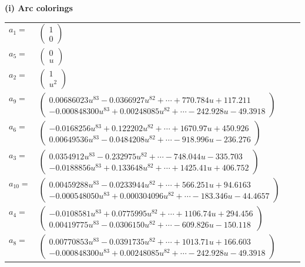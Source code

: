 \documentclass[1p]{elsarticle_modified}
\theoremstyle{definition}
\begin{document}
\flushleft \textbf{(i) Arc colorings}\\
\begin{tabular}{m{7pt} m{180pt} m{7pt} m{180pt} }
\flushright $a_{1}=$&$\begin{pmatrix}1\\0\end{pmatrix}$ \\
\flushright $a_{5}=$&$\begin{pmatrix}0\\u\end{pmatrix}$ \\
\flushright $a_{2}=$&$\begin{pmatrix}1\\u^2\end{pmatrix}$ \\
\flushright $a_{9}=$&$\begin{pmatrix}0.00686023 u^{83}-0.0366927 u^{82}+\cdots+770.784 u+117.211\\-0.000848300 u^{83}+0.00248085 u^{82}+\cdots-242.928 u-49.3918\end{pmatrix}$ \\
\flushright $a_{6}=$&$\begin{pmatrix}-0.0168256 u^{83}+0.122202 u^{82}+\cdots+1670.97 u+450.926\\0.00649536 u^{83}-0.0484208 u^{82}+\cdots-918.996 u-236.276\end{pmatrix}$ \\
\flushright $a_{3}=$&$\begin{pmatrix}0.0354912 u^{83}-0.232975 u^{82}+\cdots-748.044 u-335.703\\-0.0188856 u^{83}+0.133648 u^{82}+\cdots+1425.41 u+406.752\end{pmatrix}$ \\
\flushright $a_{10}=$&$\begin{pmatrix}0.00459288 u^{83}-0.0233944 u^{82}+\cdots+566.251 u+94.6163\\-0.000548050 u^{83}+0.000304096 u^{82}+\cdots-183.346 u-44.4657\end{pmatrix}$ \\
\flushright $a_{4}=$&$\begin{pmatrix}-0.0108581 u^{83}+0.0775995 u^{82}+\cdots+1106.74 u+294.456\\0.00419775 u^{83}-0.0306150 u^{82}+\cdots-609.826 u-150.118\end{pmatrix}$ \\
\flushright $a_{8}=$&$\begin{pmatrix}0.00770853 u^{83}-0.0391735 u^{82}+\cdots+1013.71 u+166.603\\-0.000848300 u^{83}+0.00248085 u^{82}+\cdots-242.928 u-49.3918\end{pmatrix}$ \\

\end{tabular}
\end{document}
